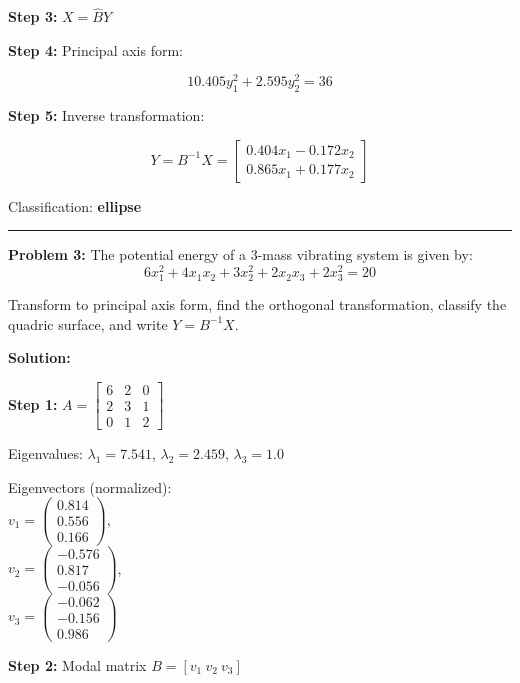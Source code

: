 \documentclass[
  letterpaper,
  DIV=11,
  numbers=noendperiod]{scrreprt}
\begin{document}
\textbf{Step 3:} \(X = \hat{B}Y\)

\textbf{Step 4:} Principal axis form:

\[
10.405 y_1^2 + 2.595 y_2^2 = 36
\]

\textbf{Step 5:} Inverse transformation:

\[
Y = B^{-1}X =
\begin{bmatrix}
0.404 x_1 - 0.172 x_2\\
0.865 x_1 + 0.177 x_2
\end{bmatrix}
\]

Classification: \textbf{ellipse}

\begin{center}\rule{0.5\linewidth}{0.5pt}\end{center}

\textbf{Problem 3:} The potential energy of a 3-mass vibrating system is
given by:\\
\[
6x_1^{2}+4x_1x_2+3x_2^{2}+2x_2x_3+2x_3^{2}=20
\]

Transform to principal axis form, find the orthogonal transformation,
classify the quadric surface, and write \(Y=B^{-1}X\).

\textbf{Solution:}

\textbf{Step 1:}
\(A = \begin{bmatrix}6 & 2 & 0\\2 & 3 & 1\\0 & 1 & 2\end{bmatrix}\)

Eigenvalues: \(\lambda_1 = 7.541\), \(\lambda_2 = 2.459\),
\(\lambda_3 = 1.0\)

Eigenvectors (normalized):\\
\(v_1 = \begin{pmatrix}0.814\\0.556\\0.166\end{pmatrix}\),\\
\(v_2 = \begin{pmatrix}-0.576\\0.817\\-0.056\end{pmatrix}\),\\
\(v_3 = \begin{pmatrix}-0.062\\-0.156\\0.986\end{pmatrix}\)

\textbf{Step 2:} Modal matrix \(B = [v_1\ v_2\ v_3]\)
\end{document}
